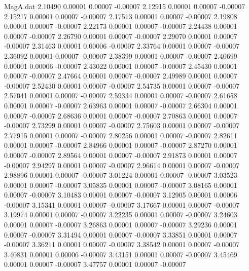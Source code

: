 \begin{filecontents}{MagA.dat}
   2.10490    0.00001    0.00007   -0.00007
   2.12915    0.00001    0.00007   -0.00007
   2.15217    0.00001    0.00007   -0.00007
   2.17513    0.00001    0.00007   -0.00007
   2.19808    0.00001    0.00007   -0.00007
   2.22173    0.00001    0.00007   -0.00007
   2.24438    0.00001    0.00007   -0.00007
   2.26790    0.00001    0.00007   -0.00007
   2.29070    0.00001    0.00007   -0.00007
   2.31463    0.00001    0.00006   -0.00007
   2.33764    0.00001    0.00007   -0.00007
   2.36092    0.00001    0.00007   -0.00007
   2.38399    0.00001    0.00007   -0.00007
   2.40699    0.00001    0.00006   -0.00007
   2.43022    0.00001    0.00007   -0.00007
   2.45430    0.00001    0.00007   -0.00007
   2.47664    0.00001    0.00007   -0.00007
   2.49989    0.00001    0.00007   -0.00007
   2.52430    0.00001    0.00007   -0.00007
   2.54735    0.00001    0.00007   -0.00007
   2.57041    0.00001    0.00007   -0.00007
   2.59334    0.00001    0.00007   -0.00007
   2.61658    0.00001    0.00007   -0.00007
   2.63963    0.00001    0.00007   -0.00007
   2.66304    0.00001    0.00007   -0.00007
   2.68636    0.00001    0.00007   -0.00007
   2.70863    0.00001    0.00007   -0.00007
   2.73299    0.00001    0.00007   -0.00007
   2.75603    0.00001    0.00007   -0.00007
   2.77915    0.00001    0.00007   -0.00007
   2.80256    0.00001    0.00007   -0.00007
   2.82611    0.00001    0.00007   -0.00007
   2.84966    0.00001    0.00007   -0.00007
   2.87270    0.00001    0.00007   -0.00007
   2.89564    0.00001    0.00007   -0.00007
   2.91873    0.00001    0.00007   -0.00007
   2.94297    0.00001    0.00007   -0.00007
   2.96614    0.00001    0.00007   -0.00007
   2.98896    0.00001    0.00007   -0.00007
   3.01224    0.00001    0.00007   -0.00007
   3.03523    0.00001    0.00007   -0.00007
   3.05835    0.00001    0.00007   -0.00007
   3.08165    0.00001    0.00007   -0.00007
   3.10483    0.00001    0.00007   -0.00007
   3.12905    0.00001    0.00006   -0.00007
   3.15341    0.00001    0.00007   -0.00007
   3.17667    0.00001    0.00007   -0.00007
   3.19974    0.00001    0.00007   -0.00007
   3.22235    0.00001    0.00007   -0.00007
   3.24603    0.00001    0.00007   -0.00007
   3.26863    0.00001    0.00007   -0.00007
   3.29236    0.00001    0.00007   -0.00007
   3.31494    0.00001    0.00007   -0.00007
   3.33851    0.00001    0.00007   -0.00007
   3.36211    0.00001    0.00007   -0.00007
   3.38542    0.00001    0.00007   -0.00007
   3.40831    0.00001    0.00006   -0.00007
   3.43151    0.00001    0.00007   -0.00007
   3.45469    0.00001    0.00007   -0.00007
   3.47757    0.00001    0.00007   -0.00007

\end{filecontents}
